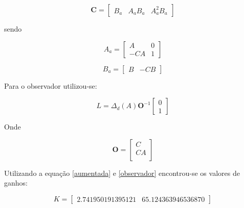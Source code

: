 \documentclass[conference,harvard,brazil,english]{sbatex}
\begin{document}
           \begin{equation}
               \textbf{C}= \begin{bmatrix}
                    B_a & A_aB_a & A_a^2B_a
               \end{bmatrix}
           \end{equation}
           
           sendo
           
           \begin{equation}
               A_a=
                    \begin{bmatrix} A & 0
                                \\  -CA & 1
                    \end{bmatrix}
           \end{equation}
           
           \begin{equation}
               B_a=
                    \begin{bmatrix} B & -CB
                    \end{bmatrix}
           \end{equation}
           
           Para o observador utilizou-se:
           
           \begin{equation}
                L=\Delta_d(A)\textbf{O}^{-1}
                \begin{bmatrix}
                    0\\ 
                    1
                \end{bmatrix}
                \label{observador}
            \end{equation}
            
            Onde
            
            \begin{equation}
                \textbf{O}=\begin{bmatrix}
                C\\
                CA\\
                \end{bmatrix}
            \end{equation}
            
            Utilizando a equação \ref{aumentada} e \ref{observador} encontrou-se os valores de ganhos:
           
           \begin{equation}
               K=\begin{bmatrix}2.741950191395121 & 65.124363946536870\end{bmatrix}
           \end{equation}
           
\end{document}
